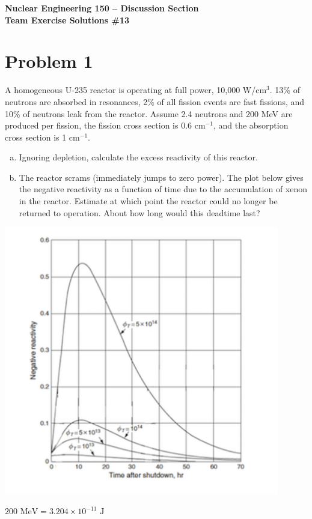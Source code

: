 \documentclass{report}
\begin{document}
\begin{center}
\textbf{\large Nuclear Engineering 150 -- Discussion Section}\\ 
\textbf{Team Exercise Solutions \#13}
\end{center}

\section*{Problem 1}

A homogeneous U-235 reactor is operating at full power, 10,000 W/cm$^3$. 13\% of neutrons are absorbed in resonances, 2\% of all fission events are fast fissions, and 10\% of neutrons leak from the reactor. Assume 2.4 neutrons and 200 MeV are produced per fission, the fission cross section is 0.6 cm$^{-1}$, and the absorption cross section is 1 cm$^{-1}$.
\begin{enumerate}[a)]
\item Ignoring depletion, calculate the excess reactivity of this reactor.
\item The reactor scrams (immediately jumps to zero power). The plot below gives the negative reactivity as a function of time due to the accumulation of xenon in the reactor. Estimate at which point the reactor could no longer be returned to operation. About how long would this deadtime last?
\end{enumerate}
\begin{center}
\vspace{1cm}
\includegraphics[width=12cm]{xenon-deadtime}
\end{center}
\vfill
$200\text{ MeV} = 3.204\times10^{-11}\text{ J}$
\end{document}
